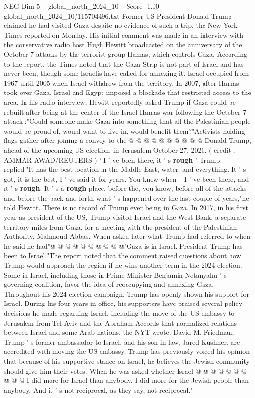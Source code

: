 \begin{textsample}{NEG Dim 5 – global\_north\_2024\_10 – Score -1.00 – global\_north\_2024\_10/115704496.txt}  \label{ex:f5_neg_058}
Former US President Donald Trump claimed he had visited Gaza despite no evidence of such a trip, the New York Times reported on Monday.
His initial comment was made in an interview with the conservative radio host Hugh Hewitt broadcasted on the anniversary of the October 7 attacks by the terrorist group Hamas, which controls Gaza.
According to the report, the Times noted that the Gaza Strip is not part of Israel and has never been, though some Israelis have called for annexing it.
Israel occupied from 1967 until 2005 when Israel withdrew from the territory.
In 2007, after Hamas took over Gaza, Israel and Egypt imposed a blockade that restricted access to the area.
In his radio interview, Hewitt reportedly asked Trump if Gaza could be rebuilt after being at the center of the Israel-Hamas war following the October 7 attack :"Could someone make Gaza into something that all the Palestinian people would be proud of, would want to live in, would benefit them?"Activists holding flags gather after joining a convoy to the @ @ @ @ @ @ @ @ @ @ Donald Trump, ahead of the upcoming US election, in Jerusalem October 27, 2020. ( credit : AMMAR AWAD/REUTERS ) ' I ' ve been there, it ' s \textbf{rough} ' Trump replied,"It has the best location in the Middle East, water, and everything.
It ' s got, it is the best, I ' ve said it for years.
You know when -- I ' ve been there, and it ' s \textbf{rough}.
It ' s a \textbf{rough} place, before the, you know, before all of the attacks and before the back and forth what ' s happened over the last couple of years,"he told Hewitt.
There is no record of Trump ever being in Gaza.
In 2017, in his first year as president of the US, Trump visited Israel and the West Bank, a separate territory miles from Gaza, for a meeting with the president of the Palestinian Authority, Mahmoud Abbas.
When asked later what Trump had referred to when he said he had"@ @ @ @ @ @ @ @ @ @"Gaza is in Israel.
President Trump has been to Israel."The report noted that the comment raised questions about how Trump would approach the region if he wins another term in the 2024 election.
Some in Israel, including those in Prime Minister Benjamin Netanyahu ' s governing coalition, favor the idea of reoccupying and annexing Gaza.
Throughout his 2024 election campaign, Trump has openly shown his support for Israel.
During his four years in office, his supporters have praised several policy decisions he made regarding Israel, including the move of the US embassy to Jerusalem from Tel Aviv and the Abraham Accords that normalized relations between Israel and some Arab nations, the NYT wrote.
David M.
Friedman, Trump ' s former ambassador to Israel, and his son-in-law, Jared Kushner, are accredited with moving the US embassy.
Trump has previously voiced his opinion that because of his supportive stance on Israel, he believes the Jewish community should give him their votes.
When he was asked whether Israel @ @ @ @ @ @ @ @ @ @ I did more for Israel than anybody.
I did more for the Jewish people than anybody.
And it ' s not reciprocal, as they say, not reciprocal."

\end{textsample}

